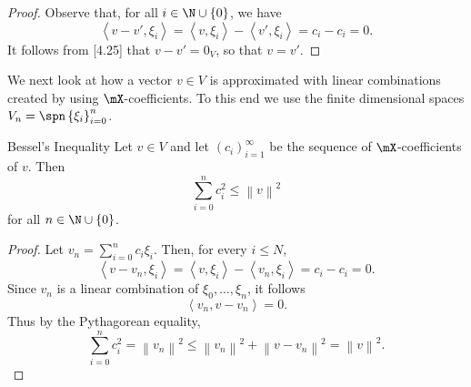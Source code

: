 \documentclass[pmath450]{subfiles}
\begin{document}
    \begin{proof}
        Observe that, for all $i\in\N\cup\left\lbrace 0 \right\rbrace$, we have
        \begin{equation*}
            \left\langle v-v', \xi_i\right\rangle = \left\langle v, \xi_i\right\rangle-\left\langle v', \xi_i\right\rangle = c_i-c_i = 0.
        \end{equation*}
        It follows from [4.25] that $v-v'=0_V$, so that $v=v'$.
    \end{proof}

    \np We next look at how a vector $v\in V$ is approximated with linear combinations created by using $\mX$-coefficients. To this end we use the finite dimensional spaces $V_n = \spn\left\lbrace \xi_i \right\rbrace^{n}_{i=0}$.

    \begin{lemma}{Bessel's Inequality}
        Let $v\in V$ and let $\left( c_{i} \right)^{\infty}_{i=1}$ be the sequence of $\mX$-coefficients of $v$. Then
        \begin{equation*}
            \sum^{n}_{i=0}c_i^{2} \leq\left\lVert v\right\rVert^{2}
        \end{equation*}
        for all $n\in\N\cup\left\lbrace 0 \right\rbrace$.
    \end{lemma}

    \begin{proof}
        Let $v_n = \sum^{n}_{i=0}c_i\xi_i$. Then, for every $i\leq N$,
        \begin{equation}
            \left\langle v-v_n, \xi_i\right\rangle = \left\langle v, \xi_i\right\rangle-\left\langle v_n, \xi_i\right\rangle = c_i-c_i = 0.
        \end{equation}
        Since $v_n$ is a linear combination of $\xi_0,\ldots,\xi_n$, it follows
        \begin{equation*}
            \left\langle v_n, v-v_n\right\rangle = 0.
        \end{equation*}
        Thus by the Pythagorean equality,
        \begin{equation*}
            \sum^{n}_{i=0}c_i^{2} = \left\lVert v_n\right\rVert^{2} \leq \left\lVert v_n\right\rVert^{2} + \left\lVert v-v_n\right\rVert^{2} = \left\lVert v\right\rVert^{2}.
        \end{equation*}
    \end{proof}
\end{document}
